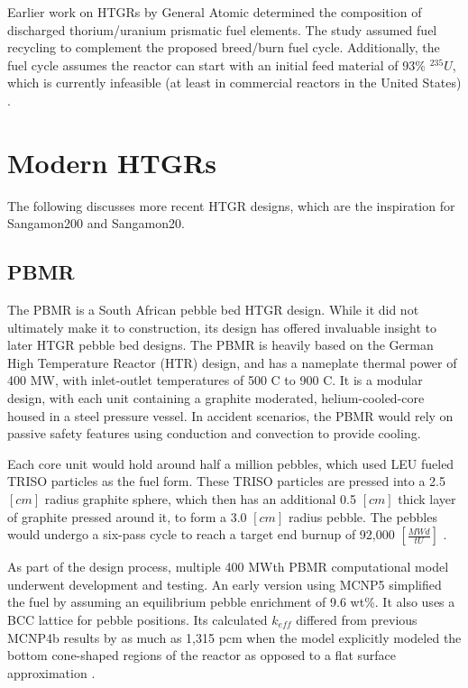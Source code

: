 Earlier work on HTGRs by General Atomic determined the composition of discharged thorium/uranium prismatic fuel elements.  The study assumed fuel recycling to complement the proposed breed/burn fuel cycle.  Additionally, the fuel cycle assumes the reactor can start with an initial feed material of 93\% $^{235}U$, which is currently infeasible (at least in commercial reactors in the United States) \cite{hamilton_htgr_1976}.


\section{Modern HTGRs}
\label{sec:modern}

The following discusses more recent  HTGR designs, which are the inspiration for Sangamon200 and Sangamon20.

\subsection{PBMR}

The PBMR is a South African pebble bed HTGR design.  While it did not ultimately make it to construction, its design has offered invaluable insight to later HTGR pebble bed designs.  The PBMR is heavily based on the German High Temperature Reactor (HTR) design, and has a nameplate thermal power of 400 MW, with inlet-outlet temperatures of 500 \textdegree C to 900 \textdegree C.  It is a modular design, with each unit containing a graphite moderated, helium-cooled-core housed in a steel pressure vessel.  In accident scenarios, the PBMR would rely on passive safety features using conduction and convection to provide cooling.

Each core unit would hold around half a million pebbles, which used LEU fueled TRISO particles as the fuel form.  These TRISO particles are pressed into a 2.5 $\left[cm\right]$ radius graphite sphere, which then has an additional 0.5 $\left[cm\right]$ thick layer of graphite pressed around it, to form a 3.0 $\left[cm\right]$ radius pebble.  The pebbles would undergo a six-pass cycle to reach a target end burnup of 92,000 $\left[\frac{MWd}{tU}\right]$ \cite{venter_pbmr_2005}.

As part of the design process, multiple 400 MWth PBMR computational model underwent development and testing.  An early version using MCNP5 simplified the fuel by assuming an equilibrium pebble enrichment of 9.6 wt\%.  It also uses a BCC lattice for pebble positions.  Its calculated $k_{eff}$ differed from previous MCNP4b results by as much as 1,315 pcm when the model explicitly modeled the bottom cone-shaped regions of the reactor as opposed to a flat surface approximation \cite{kim_monte_nodate}.

